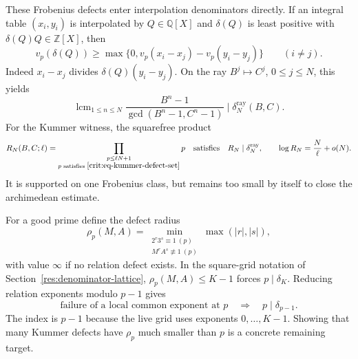 \documentclass[11pt,oneside]{article}
\theoremstyle{definition}
\theoremstyle{remark}
\newcommand{\Z}{\mathbb Z}
\newcommand{\Q}{\mathbb Q}
\begin{document}
These Frobenius defects enter interpolation denominators directly.  If an integral table
$(x_i,y_i)$ is interpolated by $Q\in\Q[X]$ and $\delta(Q)$ is least positive with
$\delta(Q)Q\in\Z[X]$, then
\begin{equation}
 v_p(\delta(Q))\ge
 \max\{0,v_p(x_i-x_j)-v_p(y_i-y_j)\}\qquad(i\ne j).
 \label{crit:eq-collision-valuation}
\end{equation}
Indeed $x_i-x_j$ divides $\delta(Q)(y_i-y_j)$.  On the ray
$B^j\mapsto C^j$, $0\le j\le N$, this yields
\begin{equation}
 \operatorname{lcm}_{1\le n\le N}
 \frac{B^n-1}{\gcd(B^n-1,C^n-1)}
 \mid\delta_N^{\mathrm{ray}}(B,C).
 \label{crit:eq-ray-lcm-divisor}
\end{equation}
For the Kummer witness, the squarefree product
\begin{equation}
 R_N(B,C;\ell)=
 \prod_{\substack{p\le\ell N+1\\p\text{ satisfies }\eqref{crit:eq-kummer-defect-set}}}p
 \quad\text{satisfies}\quad
 R_N\mid\delta_N^{\mathrm{ray}},
 \qquad
 \log R_N=\frac N\ell+o(N).
 \label{crit:eq-kummer-squarefree-divisor}
\end{equation}
It is supported on one Frobenius class, but remains too small by itself to close the
archimedean estimate.

For a good prime define the defect radius
\[
 \rho_p(M,A)=\min_{\substack{2^r3^s\equiv1\ (p)\\M^rA^s\not\equiv1\ (p)}}
 \max(|r|,|s|),
\]
with value $\infty$ if no relation defect exists.  In the square-grid notation of
Section~\ref{res:denominator-lattice}, $\rho_p(M,A)\le K-1$ forces
$p\mid\delta_K$.  Reducing relation exponents modulo $p-1$ gives
\begin{equation}
 \text{failure of a local common exponent at }p
 \quad\Longrightarrow\quad p\mid\delta_{p-1}.
 \label{crit:eq-box-defect-detection}
\end{equation}
The index is $p-1$ because the live grid uses exponents $0,\ldots,K-1$.  Showing that many
Kummer defects have $\rho_p$ much smaller than $p$ is a concrete remaining target.
\end{document}
